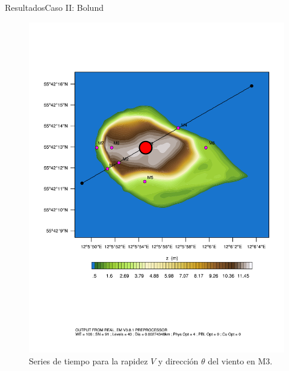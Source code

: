 \documentclass[mathserif,10pt]{beamer}
\begin{document}
\begin{frame}{Resultados}{Caso II: Bolund}
\begin{figure}[H]
\begin{minipage}{0.35\linewidth}
		\includegraphics[width=1\linewidth,page=1,trim={3.5cm 9.3cm 0.8cm 3.8cm},clip]{fig/05/ppt/bol_control_point3.pdf}%
	\end{minipage}%
		\vspace{-2mm}\caption{Series de tiempo para la rapidez $V$ y dirección $\theta$ del viento en M3.}
		\label{fig:06_bol_ts_m3}
	\end{figure}
\end{frame}
\end{document}
